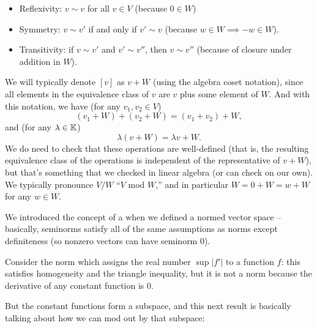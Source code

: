 \begin{itemize}
    \item Reflexivity: $v \sim v$ for all $v \in V$ (because $0 \in W$)
    \item Symmetry: $v \sim v'$ if and only if $v' \sim v$ (because $w \in W \implies -w \in W$).
    \item Transitivity: if $v \sim v'$ and $v' \sim v''$, then $v \sim v''$ (because of closure under addition in $W$).
\end{itemize}

We will typically denote $[v]$ as $v + W$ (using the algebra coset notation), since all elements in the equivalence class of $v$ are $v$ plus some element of $W$. And with this notation, we have (for any $v_1, v_2 \in V$)
\[
    (v_1 + W) + (v_2 + W) = (v_1 + v_2) + W,
\]
and (for any $\lambda \in \mathbb K$)
\[
    \lambda(v + W) = \lambda v + W.
\]
We do need to check that these operations are well-defined (that is, the resulting equivalence class of the operations is independent of the representative of $v + W$), but that's something that we checked in linear algebra (or can check on our own). We typically pronounce $V/W$ ``$V$ mod $W$,'' and in particular $W = 0 + W = w + W$ for any $w \in W$.

We introduced the concept of a  when we defined a normed vector space -- basically, seminorms satisfy all of the same assumptions as norms except definiteness (so nonzero vectors can have seminorm $0$). 

\begin{example}
Consider the norm which assigns the real number $\sup |f'|$ to a function $f$: this satisfies homogeneity and the triangle inequality, but it is not a norm because the derivative of any constant function is $0$. 
\end{example}

But the constant functions form a subspace, and this next result is basically talking about how we can mod out by that subspace:

